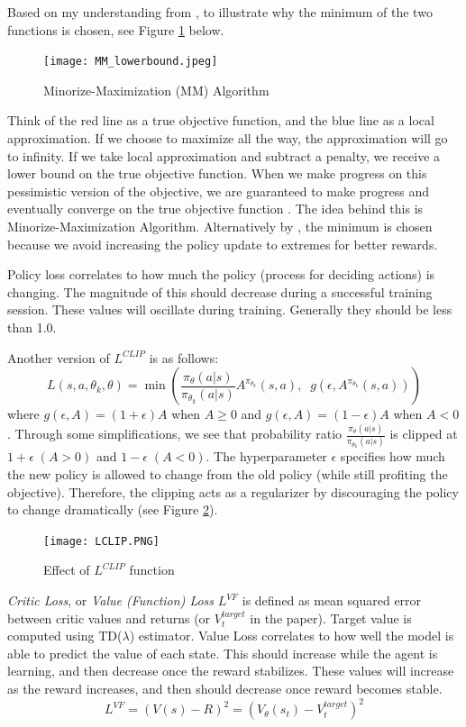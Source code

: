 \documentclass[lang=en,mode=normal,device=normal,color=blue,12pt]{elegantnote}
\DeclareMathOperator*{\1}{\mathbbm{1}}
\begin{document}
Based on my understanding from \cite{ppocs294}, to illustrate why the minimum of the two functions is chosen, see Figure \ref{fig:mm_algo} below.
\begin{figure}[!ht]
  \centering
  \texttt{[image: MM\_lowerbound.jpeg]}
  \caption{Minorize-Maximization (MM) Algorithm}
  \label{fig:mm_algo}
\end{figure}
Think of the red line as a true objective function, and the blue line as a local approximation.
If we choose to maximize all the way, the approximation will go to infinity.
If we take local approximation and subtract a penalty, we receive a lower bound on the true objective function.
When we make progress on this pessimistic version of the objective, we are guaranteed to make progress and eventually converge on the true objective function . The idea behind this is Minorize-Maximization Algorithm.
Alternatively by \cite{weng2018PG}, the minimum is chosen because we avoid increasing the policy update to extremes for better rewards.

Policy loss correlates to how much the policy (process for deciding actions) is changing.
The magnitude of this should decrease during a successful training session.
These values will oscillate during training. Generally they should be less than 1.0.


Another version of $L^{CLIP}$ is as follows:
$$ L(s,a,\theta_k,\theta) = \min\left(
\frac{\pi_{\theta}(a|s)}{\pi_{\theta_k}(a|s)}  A^{\pi_{\theta_k}}(s,a), \;\;
g(\epsilon, A^{\pi_{\theta_k}}(s,a))
\right) $$
where $g(\epsilon,A) = (1+\epsilon)A$ when $A \geq 0$ and $g(\epsilon,A) = (1-\epsilon)A$ when $A < 0$. Through some simplifications, we see that probability ratio $\frac{\pi_{\theta}(a|s)}{\pi_{\theta_k}(a|s)}$ is clipped at $1+\epsilon\;(A>0)$ and $1-\epsilon\;(A<0)$. The hyperparameter $\epsilon$ specifies how much the new policy is allowed to change from the old policy (while still profiting the objective). Therefore, the clipping acts as a regularizer by discouraging the policy to change dramatically (see Figure \ref{fig:lclip}).

\begin{figure}[!ht]
  \centering
  \texttt{[image: LCLIP.PNG]}
  \caption{Effect of $L^{CLIP}$ function \cite{ppolclip}}
  \label{fig:lclip}
\end{figure}

\textit{Critic Loss}, or \textit{Value (Function) Loss} $L^{VF}$ is defined as mean squared error between critic values and returns (or $V_t^{target}$ in the paper).
Target value is computed using TD($\lambda$) estimator.
Value Loss correlates to how well the model is able to predict the value of each state.
This should increase while the agent is learning, and then decrease once the reward stabilizes.
These values will increase as the reward increases, and then should decrease once reward becomes stable.
\[
L^{VF} = (V(s) - R)^2 = (V_\theta(s_t) - V_t^{target})^2
\]
\end{document}
